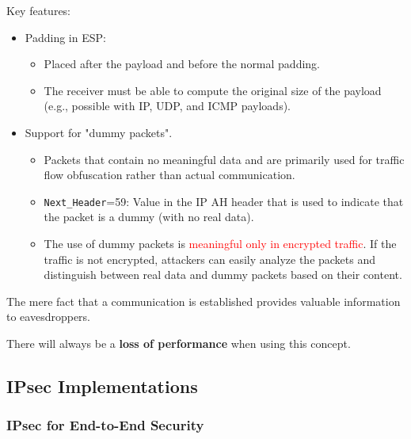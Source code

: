 Key features:
\begin{itemize}
    \item Padding in ESP:
    \begin{itemize}
        \item Placed after the payload and before the normal padding.
        \item The receiver must be able to compute the original size of the payload (e.g., possible with IP, UDP, and ICMP payloads).
    \end{itemize}
    \item Support for "dummy packets".
        \begin{itemize}
            \item Packets that contain no meaningful data and are primarily used for traffic flow obfuscation rather than actual communication.
            \item \texttt{Next\_Header}=59: Value in the IP AH header that is used to indicate that the packet is a dummy (with no real data).
            \item The use of dummy packets is \textcolor{red}{meaningful only in encrypted traffic}. If the traffic is not encrypted, attackers can easily analyze the packets and distinguish between real data and dummy packets based on their content.
        \end{itemize}
\end{itemize}

\begin{tcolorbox}[colback=blue!10!white, colframe=blue!50!white, title=Cool Information]
    The mere fact that a communication is established provides valuable information to eavesdroppers.
\end{tcolorbox}

\begin{tcolorbox}[colback=red!10!white, colframe=red!70!black, coltitle=white, title=Beware]
        There will always be a \textbf{loss of performance} when using this concept.
\end{tcolorbox}

\clearpage
\subsection{IPsec Implementations}

\subsubsection{IPsec for End-to-End Security}

